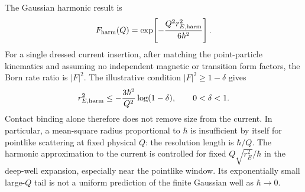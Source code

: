 The Gaussian harmonic result is
\begin{equation}
 F_{\rm harm}(Q)=\exp\!\left[-\frac{Q^2r_{E,{\rm harm}}^2}{6\hbar^2}\right].
 \label{eq:gaussian-current}
\end{equation}
For a single dressed current insertion, after matching the point-particle kinematics and assuming no independent magnetic or transition form factors, the Born rate ratio is $|F|^2$. The illustrative condition $|F|^2\geq1-\delta$ gives
\begin{equation}
 r_{E,{\rm harm}}^2\leq
 -\frac{3\hbar^2}{Q^2}\log(1-\delta),\qquad 0<\delta<1 .
\end{equation}
Contact binding alone therefore does not remove size from the current. In particular, a mean-square radius proportional to $\hbar$ is insufficient by itself for pointlike scattering at fixed physical $Q$: the resolution length is $\hbar/Q$. The harmonic approximation to the current is controlled for fixed $Q\sqrt{r_E^2}/\hbar$ in the deep-well expansion, especially near the pointlike window. Its exponentially small large-$Q$ tail is not a uniform prediction of the finite Gaussian well as $\hbar\to0$.

